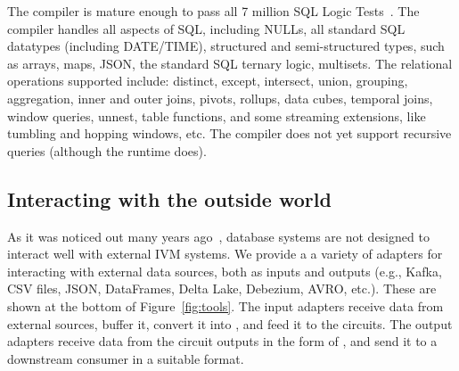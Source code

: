 The compiler is mature enough to pass all 7 million SQL Logic
Tests~\cite{sqllogictest}.  The compiler handles all aspects of SQL,
including NULLs, all standard SQL datatypes (including DATE/TIME),
structured and semi-structured types, such as arrays, maps, JSON, the
standard SQL ternary logic, multisets.  The relational operations
supported include: distinct, except, intersect, union, grouping,
aggregation, inner and outer joins, pivots, rollups, data cubes,
temporal joins, window queries, unnest, table functions, and some
streaming extensions, like tumbling and hopping windows, etc.  The
compiler does not yet support recursive queries (although the runtime
does).

\subsection{Interacting with the outside world}

As it was noticed out many years ago~\cite{labio-vldb00}, database
systems are not designed to interact well with external IVM systems.
We provide a a variety of adapters for interacting with external data
sources, both as inputs and outputs (e.g., Kafka, CSV files, JSON,
DataFrames, Delta Lake, Debezium, AVRO, etc.).  These are shown at the
bottom of Figure~\ref{fig:tools}.  The input adapters receive data
from external sources, buffer it, convert it into \zrs, and feed it to
the circuits.  The output adapters receive data from the circuit
outputs in the form of \zrs, and send it to a downstream consumer in a
suitable format.


